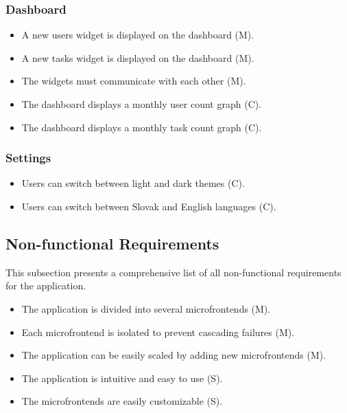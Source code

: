 \subsubsection*{Dashboard}
\begin{itemize}
   \item A new users widget is displayed on the dashboard (M).
   \item A new tasks widget is displayed on the dashboard (M).
   \item The widgets must communicate with each other (M).
   \item The dashboard displays a monthly user count graph (C).
   \item The dashboard displays a monthly task count graph (C).
\end{itemize}

\subsubsection*{Settings}
\begin{itemize}
   \item Users can switch between light and dark themes (C).
   \item Users can switch between Slovak and English languages (C).
\end{itemize}

\subsection{Non-functional Requirements}
This subsection presents a comprehensive list of all non-functional requirements for the application.
\begin{itemize}
   \item The application is divided into several microfrontends (M).
   \item Each microfrontend is isolated to prevent cascading failures (M).
   \item The application can be easily scaled by adding new microfrontends (M).
   \item The application is intuitive and easy to use (S).
   \item The microfrontends are easily customizable (S).
\end{itemize}